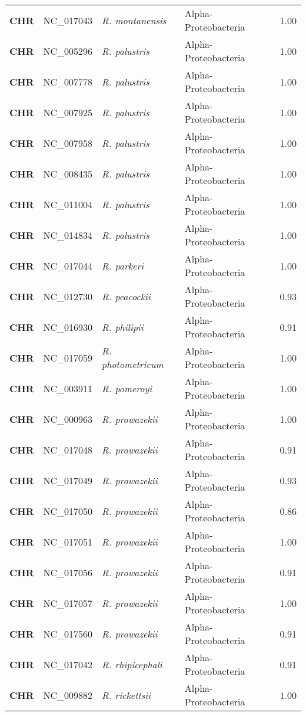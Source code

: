 \begin{adjustwidth}{-3cm}{2cm}
{\begin{supertabular}{>{\bfseries}l|p{0.1\textwidth}p{0.14\textwidth}l|l}
CHR & NC\_017043 & \textit{R. montanensis} & Alpha-Proteobacteria & 1.00\\
CHR & NC\_005296 & \textit{R. palustris} & Alpha-Proteobacteria & 1.00\\
CHR & NC\_007778 & \textit{R. palustris} & Alpha-Proteobacteria & 1.00\\
CHR & NC\_007925 & \textit{R. palustris} & Alpha-Proteobacteria & 1.00\\
CHR & NC\_007958 & \textit{R. palustris} & Alpha-Proteobacteria & 1.00\\
CHR & NC\_008435 & \textit{R. palustris} & Alpha-Proteobacteria & 1.00\\
CHR & NC\_011004 & \textit{R. palustris} & Alpha-Proteobacteria & 1.00\\
CHR & NC\_014834 & \textit{R. palustris} & Alpha-Proteobacteria & 1.00\\
CHR & NC\_017044 & \textit{R. parkeri} & Alpha-Proteobacteria & 1.00\\
CHR & NC\_012730 & \textit{R. peacockii} & Alpha-Proteobacteria & 0.93\\
CHR & NC\_016930 & \textit{R. philipii} & Alpha-Proteobacteria & 0.91\\
CHR & NC\_017059 & \textit{R. photometricum} & Alpha-Proteobacteria & 1.00\\
CHR & NC\_003911 & \textit{R. pomeroyi} & Alpha-Proteobacteria & 1.00\\
CHR & NC\_000963 & \textit{R. prowazekii} & Alpha-Proteobacteria & 1.00\\
CHR & NC\_017048 & \textit{R. prowazekii} & Alpha-Proteobacteria & 0.91\\
CHR & NC\_017049 & \textit{R. prowazekii} & Alpha-Proteobacteria & 0.93\\
CHR & NC\_017050 & \textit{R. prowazekii} & Alpha-Proteobacteria & 0.86\\
CHR & NC\_017051 & \textit{R. prowazekii} & Alpha-Proteobacteria & 1.00\\
CHR & NC\_017056 & \textit{R. prowazekii} & Alpha-Proteobacteria & 0.91\\
CHR & NC\_017057 & \textit{R. prowazekii} & Alpha-Proteobacteria & 1.00\\
CHR & NC\_017560 & \textit{R. prowazekii} & Alpha-Proteobacteria & 0.91\\
CHR & NC\_017042 & \textit{R. rhipicephali} & Alpha-Proteobacteria & 0.91\\
CHR & NC\_009882 & \textit{R. rickettsii} & Alpha-Proteobacteria & 1.00\\

\end{supertabular}}
\end{adjustwidth}
